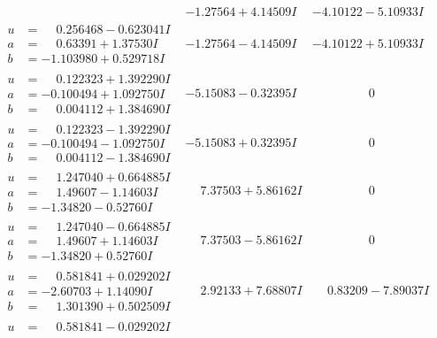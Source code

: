 \documentclass[1p]{elsarticle_modified}
\theoremstyle{definition}
\begin{document}
$$\begin{array}{c|c|c}
 & -1.27564 + 4.14509 I & -4.10122 - 5.10933 I \\ \hline\begin{aligned}
u &= \phantom{-}0.256468 - 0.623041 I \\
a &= \phantom{-}0.63391 + 1.37530 I \\
b &= -1.103980 + 0.529718 I\end{aligned}
 & -1.27564 - 4.14509 I & -4.10122 + 5.10933 I \\ \hline\begin{aligned}
u &= \phantom{-}0.122323 + 1.392290 I \\
a &= -0.100494 + 1.092750 I \\
b &= \phantom{-}0.004112 + 1.384690 I\end{aligned}
 & -5.15083 - 0.32395 I & \phantom{-0.000000 } 0 \\ \hline\begin{aligned}
u &= \phantom{-}0.122323 - 1.392290 I \\
a &= -0.100494 - 1.092750 I \\
b &= \phantom{-}0.004112 - 1.384690 I\end{aligned}
 & -5.15083 + 0.32395 I & \phantom{-0.000000 } 0 \\ \hline\begin{aligned}
u &= \phantom{-}1.247040 + 0.664885 I \\
a &= \phantom{-}1.49607 - 1.14603 I \\
b &= -1.34820 - 0.52760 I\end{aligned}
 & \phantom{-}7.37503 + 5.86162 I & \phantom{-0.000000 } 0 \\ \hline\begin{aligned}
u &= \phantom{-}1.247040 - 0.664885 I \\
a &= \phantom{-}1.49607 + 1.14603 I \\
b &= -1.34820 + 0.52760 I\end{aligned}
 & \phantom{-}7.37503 - 5.86162 I & \phantom{-0.000000 } 0 \\ \hline\begin{aligned}
u &= \phantom{-}0.581841 + 0.029202 I \\
a &= -2.60703 + 1.14090 I \\
b &= \phantom{-}1.301390 + 0.502509 I\end{aligned}
 & \phantom{-}2.92133 + 7.68807 I & \phantom{-}0.83209 - 7.89037 I \\ \hline\begin{aligned}
u &= \phantom{-}0.581841 - 0.029202 I \\

\end{aligned}
\end{array}$$
\end{document}
